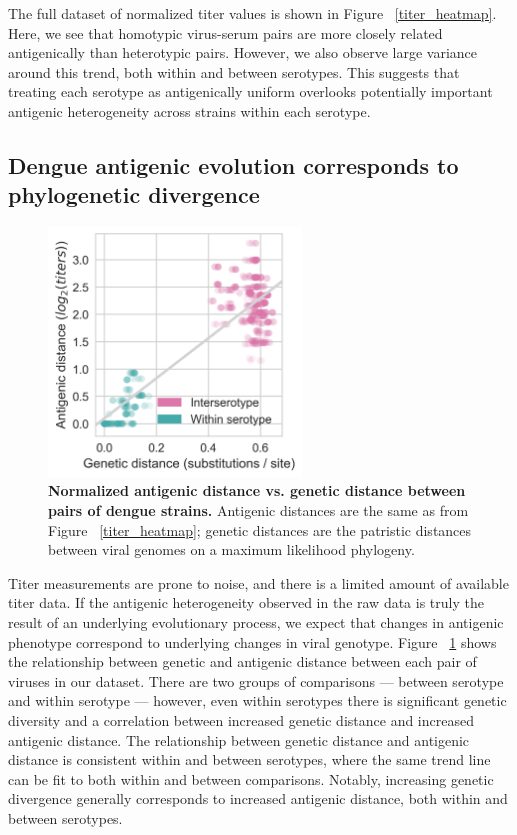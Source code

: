 \documentclass[11pt,oneside,letterpaper]{article}
\begin{document}
The full dataset of normalized titer values is shown in Figure ~\ref{titer_heatmap}.
Here, we see that homotypic virus-serum pairs are more closely related antigenically than heterotypic pairs.
However, we also observe large variance around this trend, both within and between serotypes.
This suggests that treating each serotype as antigenically uniform overlooks potentially important antigenic heterogeneity across strains within each serotype.

\subsection{Dengue antigenic evolution corresponds to phylogenetic divergence}

\begin{figure}[h]
  \begin{centering}
  \includegraphics[width=0.6\textwidth]{../figures/png/genetic_antigenic_distance.png}
  	\caption{\textbf{Normalized antigenic distance vs. genetic distance between pairs of dengue strains.} Antigenic distances are the same as from Figure ~\ref{titer_heatmap}; genetic distances are the patristic distances between viral genomes on a maximum likelihood phylogeny.}
  	\label{genetic_antigenic_distance}
  \end{centering}
\end{figure}

Titer measurements are prone to noise, and there is a limited amount of available titer data.
If the antigenic heterogeneity observed in the raw data is truly the result of an underlying evolutionary process, we expect that changes in antigenic phenotype correspond to underlying changes in viral genotype.
Figure ~\ref{genetic_antigenic_distance} shows the relationship between genetic and antigenic distance between each pair of viruses in our dataset.
There are two groups of comparisons --- between serotype and within serotype --- however, even within serotypes there is significant genetic diversity and a correlation between increased genetic distance and increased antigenic distance.
The relationship between genetic distance and antigenic distance is consistent within and between serotypes, where the same trend line can be fit to both within and between comparisons.
Notably, increasing genetic divergence generally corresponds to increased antigenic distance, both within and between serotypes.
\end{document}
